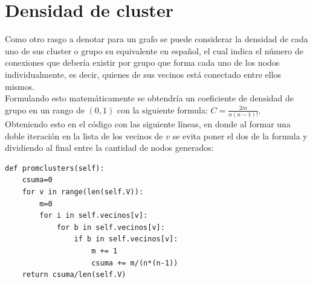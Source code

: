 \documentclass[12pt]{article}
\begin{document}
\section{Densidad de cluster}
Como otro rasgo a denotar para un grafo se puede considerar la densidad de cada uno de sus cluster o grupo su equivalente en español, el cual indica el número de conexiones que debería existir por grupo que forma cada uno de los nodos individualmente, es decir, quienes de sus vecinos está conectado entre ellos mismos.\\
Formulando esto matemáticamente se obtendría un coeficiente de densidad de grupo en un rango de $(0,1)$ con la siguiente formula: $C=\frac{2m}{n(n-1)!}$.\\ Obteniendo esto en el código con las siguiente líneas, en donde al formar una doble iteración en la lista de los vecinos de $v$ se evita poner el dos de la formula y dividiendo al final entre la cantidad de nodos generados:
\begin{lstlisting}[style=tt]
def promclusters(self):
	csuma=0
	for v in range(len(self.V)):
		m=0
		for i in self.vecinos[v]:
			for b in self.vecinos[v]:
				if b in self.vecinos[v]:
					m += 1
					csuma += m/(n*(n-1))
	return csuma/len(self.V)
\end{lstlisting}
\end{document}
